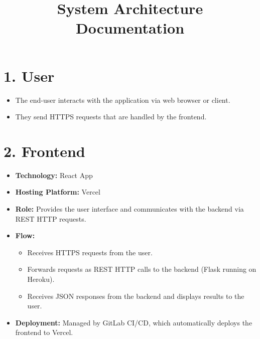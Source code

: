 \documentclass[a4paper,12pt]{article}
\title{System Architecture Documentation}
\author{}
\date{}
\begin{document}
\maketitle

\section*{1. User}
\begin{itemize}[leftmargin=*]
  \item The end-user interacts with the application via web browser or client.
  \item They send HTTPS requests that are handled by the frontend.
\end{itemize}

\section*{2. Frontend}
\begin{itemize}[leftmargin=*]
  \item \textbf{Technology:} React App
  \item \textbf{Hosting Platform:} Vercel
  \item \textbf{Role:} Provides the user interface and communicates with the backend via REST HTTP requests.
  \item \textbf{Flow:}
    \begin{itemize}
        \item Receives HTTPS requests from the user.
        \item Forwards requests as REST HTTP calls to the backend (Flask running on Heroku).
        \item Receives JSON responses from the backend and displays results to the user.
    \end{itemize}
  \item \textbf{Deployment:} Managed by GitLab CI/CD, which automatically deploys the frontend to Vercel.
\end{itemize}
\end{document}
